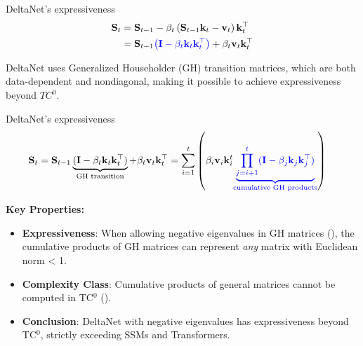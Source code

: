 \begin{frame}{DeltaNet's expressiveness}
    \begin{align*}
    \mathbf{S}_t &= \mathbf{S}_{t-1} - \beta_t \left(\mathbf{S}_{t-1} \mathbf{k}_t - \mathbf{v}_t\right) \mathbf{k}_t^\top \\
    &= \mathbf{S}_{t-1} {\color{blue}\left(\mathbf{I} - \beta_t \mathbf{k}_t \mathbf{k}_t^\top\right)} + \beta_t \mathbf{v}_t \mathbf{k}_t^\top
    \end{align*}

    DeltaNet uses {\color{blue} Generalized Householder} (GH) transition matrices, which are both {\color{red}data-dependent} and {\color{red}nondiagonal}, making it possible to achieve expressiveness beyond $TC^0$.
\end{frame}



 \begin{frame}{DeltaNet's expressiveness}
    \begin{align*}
        \mathbf{S}_t &= \mathbf{S}_{t-1} \underbrace{(\mathbf{I} - \beta_t \mathbf{k}_t \mathbf{k}_t^\top)}_{\text{GH transition}} + \beta_t \mathbf{v}_t \mathbf{k}_t^\top 
        = \sum_{i=1}^{t} \left(\beta_i \mathbf{v}_i \mathbf{k}_i^t {\color{blue}\underbrace{\prod_{j=i+1}^{t} (\mathbf{I} - \beta_j \mathbf{k}_j \mathbf{k}_j^\top)}_{\text{cumulative GH products}}}\right)
    \end{align*}

    \vspace{-8mm}
    
    \textbf{Key Properties:}
    \begin{itemize}
        
        \item \textbf{Expressiveness}: When allowing negative eigenvalues in GH matrices (\cite{Grazzi2024UnlockingSI}), {\color{blue}the cumulative products of GH matrices} can represent \textit{any} matrix with Euclidean norm < 1.
        
        \item \textbf{Complexity Class}: 
            {\color{blue}Cumulative products of general matrices} cannot be computed in TC$^0$ (\cite{Mereghetti2000ThresholdCF}).

        \item \textbf{Conclusion}: {\color{red}DeltaNet with negative eigenvalues has expressiveness beyond TC$^0$}, strictly exceeding SSMs and Transformers.
    \end{itemize}
\end{frame}
    

